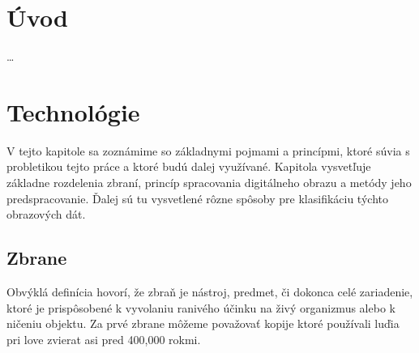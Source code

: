 
\chapter{Úvod}
\dots

\chapter{Technológie}
V tejto kapitole sa zoznámime so základnymi pojmami a princípmi, ktoré súvia s probletikou tejto práce a ktoré budú dalej využívané.
Kapitola vysvetľuje základne rozdelenia zbraní, princíp spracovania digitálneho obrazu a metódy jeho predspracovanie.
Ďalej sú tu vysvetlené rôzne spôsoby pre klasifikáciu týchto obrazových dát.


\section{Zbrane}
Obvýklá definícia hovorí, že zbraň je nástroj, predmet, či dokonca celé zariadenie,
ktoré je prispôsobené k vyvolaniu ranivého účinku na živý organizmus alebo k ničeniu objektu\cite{book:StrelneZbrane}.
Za prvé zbrane môžeme považovať kopije ktoré používali luďia pri love zvierat asi pred 400,000 rokmi\cite{prop:SpearHistory}.

